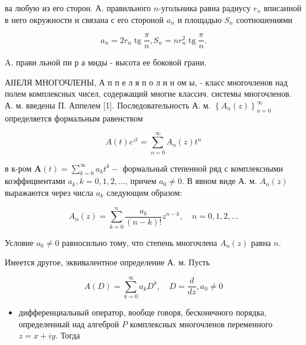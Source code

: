 \documentclass[10pt]{article}
\begin{document}
ва любую из его сторон. А. правильного $n$-угольника равна радиусу $r_{n}$ вписанной в него окружности и связана с его стороной $a_{n}$ и площадью $S_{n}$ соотношениями



\[

a_{n}=2 r_{n} \operatorname{tg} \frac{\pi}{n}, S_{n}=n r_{n}^{2} \operatorname{tg} \frac{\pi}{n} .

\]



A. прави льной пи р а миды - высота ее боковой грани.



АІІЕЛЯ МНОГОЧЛЕНЫ, А п п е л я п о л и н ом ы, - класс многочленов над полем комплексных чисел, содержащий многие классич. системы многочленов. А. м. введены П. Аппелем [1]. Последовательность А. м. $\left\{A_{n}(z)\right\}_{n=0}^{\infty}$ определяется формальным равенством



\[

A(t) e^{z t}=\sum_{n=0}^{\infty} A_{n}(z) t^{n}

\]



в к-ром $\boldsymbol{A}(t)=\sum_{k=0}^{\infty} a_{k} t^{k}-$ формальный степенной ряд с комплексными коэффициентами $a_{k}, k=0,1,2, \ldots$, причем $a_{0} \neq 0$. В явном виде А. м. $A_{n}(z)$ выражаются через числа $a_{k}$ следующим образом:



\[

A_{n}(z)=\sum_{k=0}^{n} \frac{a_{k}}{(n-k) !} z^{n-k}, \quad n=0,1,2, \ldots

\]



Условие $a_{0} \neq 0$ равносильно тому, что степень многочлена $A_{n}(z)$ равна $n$.



Имеется другое, эквивалентное определение А. м. Пусть



\[

A(D)=\sum_{k=0}^{\infty} a_{k} D^{k}, \quad D=\frac{d}{d z}, a_{0} \neq 0

\]



\begin{itemize}

  \item дифференциальный оператор, вообще говоря, бесконечного порядка, определенный над алгеброй $P$ комплексных многочленов переменного $z=x+i y$. Тогда

\end{itemize}
\end{document}
